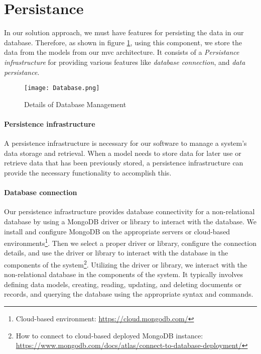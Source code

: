 \clearpage
\section{Persistance}
\label{sc:section:persistance}
In our solution approach, we must have features for persisting the data in our database.
Therefore, as shown in figure \ref{fig:sc:database}, using this component, we store the data from the models from our \ac{mvc} architecture.
It consists of a \textit{Persistance infrastructure} for providing various features like \textit{database connection}, and \textit{data persistance}.

\begin{figure}[htbp!]
    \centering    
    \texttt{[image: Database.png]} 
    \caption[Details of Database management]{Details of Database Management}
    \label{fig:sc:database}
\end{figure}

\paragraph{Persistence infrastructure}
A persistence infrastructure is necessary for our software to manage a system's data storage and retrieval. 
When a model needs to store data for later use or retrieve data that has been previously stored, a persistence infrastructure can provide the necessary functionality to accomplish this.

\paragraph{Database connection}
Our persistence infrastructure provides database connectivity for a non-relational database by using a MongoDB driver or library to interact with the database. 
We install and configure MongoDB on the appropriate servers or cloud-based environments\footnote{Cloud-based environment: \url{https://cloud.mongodb.com/}}.
Then we select a proper driver or library, configure the connection details, and use the driver or library to interact with the database in the components of the system\footnote{How to connect to cloud-based deployed MongoDB instance: \url{https://www.mongodb.com/docs/atlas/connect-to-database-deployment/}}.
Utilizing the driver or library, we interact with the non-relational database in the components of the system. It typically involves defining data models, creating, reading, updating, and deleting documents or records, and querying the database using the appropriate syntax and commands.

